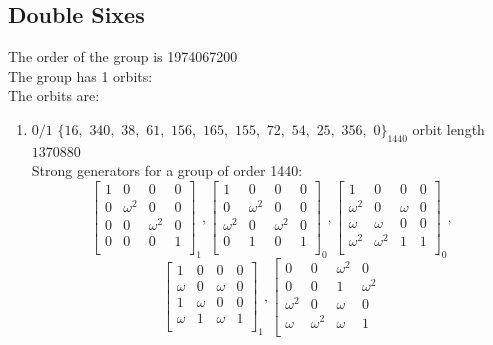 \subsection*{Double Sixes}
The order of the group is 1974067200\\
\bigskip
The group has 1 orbits: \\
The orbits are:
\begin{enumerate}[(1)]
\item
$0 / 1$ 
$
\{ 16,$ $340,$ $38,$ $61,$ $156,$ $165,$ $155,$ $72,$ $54,$ $25,$ $356,$ $0 \}_{1440}$ orbit length $1370880$\\
Strong generators for a group of order 1440:
$$
\left[
\begin{array}{*{4}{r}}
1 & 0 & 0 & 0\\
0 & \omega^{2} & 0 & 0\\
0 & 0 & \omega^{2} & 0\\
0 & 0 & 0 & 1\\
\end{array}
\right]
_{1}
, 
\left[
\begin{array}{*{4}{r}}
1 & 0 & 0 & 0\\
0 & \omega^{2} & 0 & 0\\
\omega^{2} & 0 & \omega^{2} & 0\\
0 & 1 & 0 & 1\\
\end{array}
\right]
_{0}
, 
\left[
\begin{array}{*{4}{r}}
1 & 0 & 0 & 0\\
\omega^{2} & 0 & \omega  & 0\\
\omega  & \omega  & 0 & 0\\
\omega^{2} & \omega^{2} & 1 & 1\\
\end{array}
\right]
_{0}
, 
$$
$$
\left[
\begin{array}{*{4}{r}}
1 & 0 & 0 & 0\\
\omega  & 0 & \omega  & 0\\
1 & \omega  & 0 & 0\\
\omega  & 1 & \omega  & 1\\
\end{array}
\right]
_{1}
, 
\left[
\begin{array}{*{4}{r}}
0 & 0 & \omega^{2} & 0\\
0 & 0 & 1 & \omega^{2}\\
\omega^{2} & 0 & \omega  & 0\\
\omega  & \omega^{2} & \omega  & 1\\

\end{array}$$
\end{enumerate}
